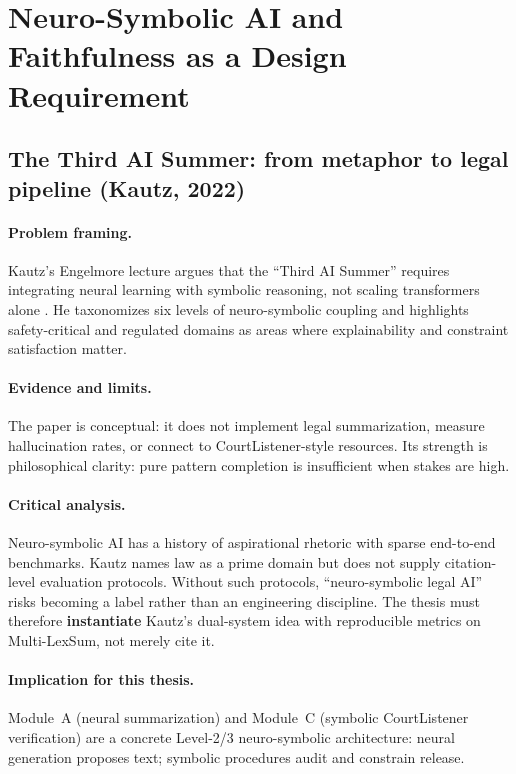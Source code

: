 \section{Neuro-Symbolic AI and Faithfulness as a Design Requirement}
\label{sec:lit-neurosymbolic}

\subsection{The Third AI Summer: from metaphor to legal pipeline (Kautz, 2022)}
\label{sec:lit-kautz}

\paragraph{Problem framing.}
Kautz's Engelmore lecture argues that the ``Third AI Summer'' requires integrating neural learning with symbolic reasoning, not scaling transformers alone \cite{kautz2022thirdaisummer}. He taxonomizes six levels of neuro-symbolic coupling and highlights safety-critical and regulated domains as areas where explainability and constraint satisfaction matter.

\paragraph{Evidence and limits.}
The paper is conceptual: it does not implement legal summarization, measure hallucination rates, or connect to CourtListener-style resources. Its strength is philosophical clarity: pure pattern completion is insufficient when stakes are high.

\paragraph{Critical analysis.}
Neuro-symbolic AI has a history of aspirational rhetoric with sparse end-to-end benchmarks. Kautz names law as a prime domain but does not supply citation-level evaluation protocols. Without such protocols, ``neuro-symbolic legal AI'' risks becoming a label rather than an engineering discipline. The thesis must therefore \textbf{instantiate} Kautz's dual-system idea with reproducible metrics on Multi-LexSum, not merely cite it.

\paragraph{Implication for this thesis.}
Module~A (neural summarization) and Module~C (symbolic CourtListener verification) are a concrete Level-2/3 neuro-symbolic architecture: neural generation proposes text; symbolic procedures audit and constrain release.

